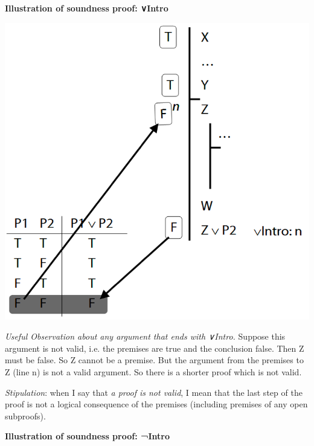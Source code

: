 \documentclass[12pt]{extarticle}
\begin{document}
\begin{multicols*}{3}
\begin{minipage}{\columnwidth}
\textbf{Illustration of soundness proof: ∨Intro}
 
\begin{center}
\includegraphics[scale=0.3]{img/soundness_or.png}
\end{center}
\end{minipage}
 
\emph{Useful Observation about any argument that ends with ∨Intro.} Suppose this argument is not valid, i.e. the premises are true and the conclusion false. Then Z must be false. So Z cannot be a premise.  But the argument from the premises to Z (line n) is not a valid argument. So there is a shorter proof which is not valid.
 
\emph{Stipulation}: when I say that \emph{a proof is not valid}, I mean that the last step of the proof is not a logical consequence of the premises (including premises of any open subproofs).
 
\begin{minipage}{\columnwidth}
 
\textbf{Illustration of soundness proof: ¬Intro}
 

\end{minipage}
\end{multicols*}
\end{document}

